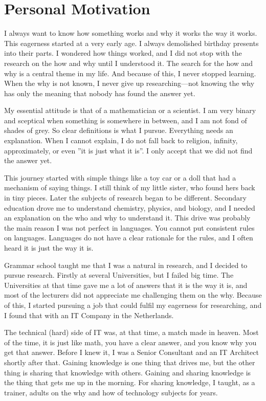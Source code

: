 \chapter{Personal Motivation}
I always want to know how something works and why it works the way it works. This eagerness started at a very early age. I always demolished birthday presents into their parts. I wondered how things worked, and I did not stop with the research on the how and why until I understood it. The search for the how and why is a central theme in my life. And because of this, I never stopped learning. When the why is not known, I never give up researching—not knowing the why has only the meaning that nobody has found the answer yet. 

My essential attitude is that of a mathematician or a scientist. I am very binary and sceptical when something is somewhere in between, and I am not fond of shades of grey. So clear definitions is what I pursue. Everything needs an explanation. When I cannot explain, I do not fall back to religion, infinity, approximately, or even ''it is just what it is''. I only accept that we did not find the answer yet.

This journey started with simple things like a toy car or a doll that had a mechanism of saying things. I still think of my little sister, who found hers back in tiny pieces. Later the subjects of research began to be different. Secondary education drove me to understand chemistry, physics, and biology, and I needed an explanation on the who and why to understand it. This drive was probably the main reason I was not perfect in languages. You cannot put consistent rules on languages.  Languages do not have a clear rationale for the rules, and I often heard it is just the way it is.

Grammar school taught me that I was a natural in research, and I decided to pursue research. Firstly at several Universities, but I failed big time. The Universities at that time gave me a lot of answers that it is the way it is, and most of the lecturers did not appreciate me challenging them on the why. Because of this, I started pursuing a job that could fulfil my eagerness for researching, and I found that with an IT Company in the Netherlands.

The technical (hard) side of IT was, at that time, a match made in heaven. Most of the time, it is just like math, you have a clear answer, and you know why you get that answer. Before I knew it, I was a Senior Consultant and an IT Architect shortly after that. Gaining knowledge is one thing that drives me, but the other thing is sharing that knowledge with others. Gaining and sharing knowledge is the thing that gets me up in the morning. For sharing knowledge, I taught, as a trainer, adults on the why and how of technology subjects for years.

